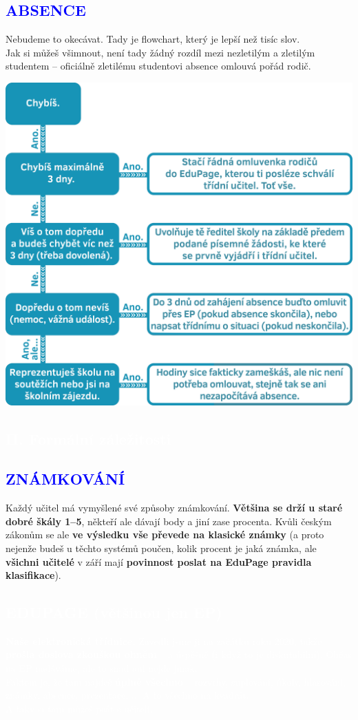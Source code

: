 \documentclass[a5paper, twoside]{article}
\newcommand{\boxik}[3]{
  \begin{tcolorbox}[
    sharp corners,
    colback = #1,
    boxrule = 0pt,
    grow to left by = 25pt,
    grow to right by = 25pt,
    right = 22pt,
    left = 22pt%
  ]
    \textcolor{#2}{#3}
  \end{tcolorbox}
}
\newcommand{\polonadpis}[4]{
  \vspace*{-50pt}
  \begin{tcolorbox}[colback = #2, boxrule = 0pt, grow to left by = #4,  grow to right by = #4, arc=8pt, height = 30pt]
    \vspace*{5pt}
    \centering \subsection*{\textcolor{#3}{#1}}
  \end{tcolorbox}
}
\newcommand{\podnadpis}[2]{
  \subsection*{\textcolor{#2}{#1}}
}
\begin{document}
\podnadpis{ABSENCE}{blue}
Nebudeme to okecávat. Tady je flowchart, který je lepší než tisíc slov. \\
\noindent Jak si můžeš všimnout, není tady žádný rozdíl mezi nezletilým a zletilým studentem -- oficiálně zletilému studentovi absence omlouvá pořád rodič.
\begin{center}
	\includegraphics[width=\linewidth]{absence.png}
\end{center}

\vspace{3em}
\pagebreak

\polonadpis{II. Formální záležitosti}{blue}{white}{-3.8cm}

\podnadpis{ZNÁMKOVÁNÍ}{blue}
Každý učitel má vymyšlené své způsoby známkování. \textbf{Většina se drží u staré dobré škály 1--5}, někteří ale dávají body a jiní zase procenta. Kvůli českým zákonům se ale \textbf{ve výsledku vše převede na klasické známky} (a proto nejenže budeš u těchto  systémů poučen, kolik procent je jaká známka, ale \textbf{všichni učitelé} v září mají \textbf{povinnost poslat na EduPage pravidla klasifikace}).

\boxik{blue}{white}{\subsection*{EDUPAGE (většinou jen EP)}
  \textbf{Naše elektronická třídnice.} Zavedli jsme ji na začátku roku 2020, takže \textbf{prošla doslova zkouškou ohněm} -- a úspěšně (i když to je diskutabilní). Občas na EP nadáváme, ale to snad ani
  nejde jinak. \\
  Faktem je, že tam najdeš \textbf{úplně všechno} -- rozvrhy, suplování, úkoly, hlasování, známky, absence, prezentace, ... A to všechno na kvadrát. \\
  A taky si tam můžeš psát s učiteli.}
\end{document}
